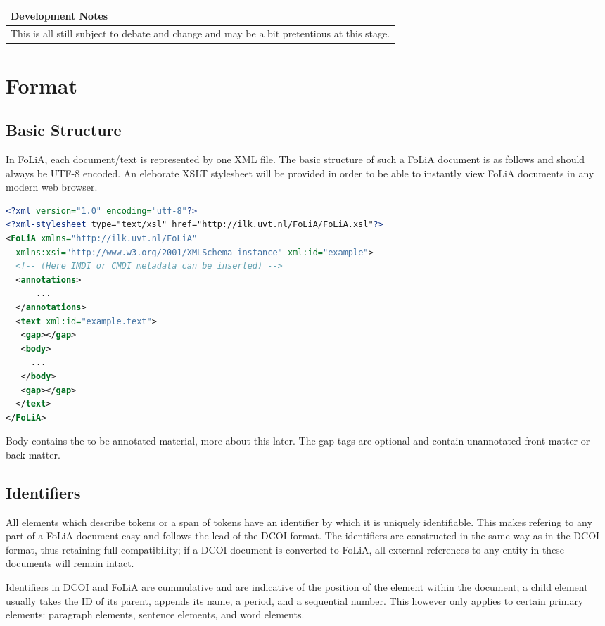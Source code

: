 \documentclass[a4paper,12pt]{report}
\newenvironment{devnotes}
{\newpage
\begin{center}
    \begin{tabular}[h!]{|p{0.8\textwidth}|}
    \hline
    {\bf Development Notes}\\\hline}
{   \\\hline
    \end{tabular}
\end{center}}
\begin{document}
\begin{devnotes}
This is all still subject to debate and change and may be a bit pretentious at this stage.
\end{devnotes}

\chapter{Format}

\section{Basic Structure}

In FoLiA, each document/text is represented by one XML file. The basic structure of such a FoLiA document is as follows and should always be UTF-8 encoded. An eleborate XSLT stylesheet will be provided in order to be able to instantly view FoLiA documents in any modern web browser.

\begin{lstlisting}[language=xml]
<?xml version="1.0" encoding="utf-8"?>
<?xml-stylesheet type="text/xsl" href="http://ilk.uvt.nl/FoLiA/FoLiA.xsl"?>
<FoLiA xmlns="http://ilk.uvt.nl/FoLiA"
  xmlns:xsi="http://www.w3.org/2001/XMLSchema-instance" xml:id="example">
  <!-- (Here IMDI or CMDI metadata can be inserted) -->
  <annotations>
      ...
  </annotations>    
  <text xml:id="example.text">
   <gap></gap>
   <body>
     ...
   </body>
   <gap></gap>
  </text>
</FoLiA>  
\end{lstlisting}

Body contains the to-be-annotated material, more about this later. The gap tags are optional and contain unannotated front matter or back matter.

\section{Identifiers}

All elements which describe tokens or a span of tokens have an identifier by which it is uniquely identifiable. This makes refering to any part of a FoLiA document easy and follows the lead of the DCOI format. The identifiers are constructed in the same way as in the DCOI format, thus retaining full compatibility; if a DCOI document is converted to FoLiA, all external references to any entity in these documents will remain intact.

Identifiers in DCOI and FoLiA are cummulative and are indicative of the position of the element within the document; a child element usually takes the ID of its parent, appends its name, a period, and a sequential number. This however only applies to certain primary elements: paragraph elements, sentence elements, and word elements.
\end{document}
